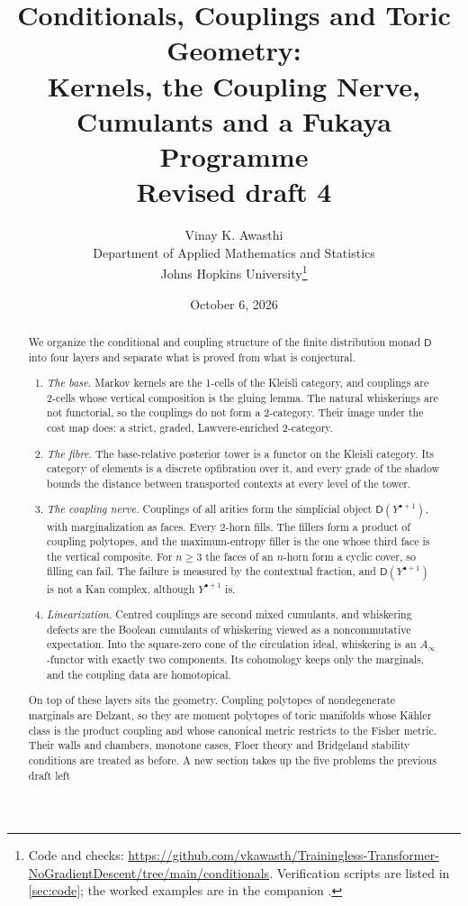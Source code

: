 \documentclass[11pt]{article}
\title{Conditionals, Couplings and Toric Geometry:\\
Kernels, the Coupling Nerve, Cumulants and a Fukaya Programme\\[4pt]
\large Revised draft 4}
\author{Vinay K. Awasthi\\
Department of Applied Mathematics and Statistics\\
Johns Hopkins University\thanks{Code and checks: \url{https://github.com/vkawasth/Trainingless-Transformer-NoGradientDescent/tree/main/conditionals}. Verification scripts are listed in \cref{sec:code}; the worked examples are
in the companion \cite{Awasthi-Family}.}}
\date{October 6, 2026}
\theoremstyle{definition}
\theoremstyle{remark}
\newcommand{\D}{\mathsf{D}}
\begin{document}
\maketitle

\begin{abstract}
We organize the conditional and coupling structure of the finite distribution monad $\D$ into four layers
and separate what is proved from what is conjectural.
\begin{enumerate}[label=(\arabic*),leftmargin=*]
\item \emph{The base.} Markov kernels are the 1-cells of the Kleisli category, and couplings are 2-cells whose
  vertical composition is the gluing lemma. The natural whiskerings are not functorial, so the couplings do not
  form a 2-category. Their image under the cost map does: a strict, graded, Lawvere-enriched 2-category.
\item \emph{The fibre.} The base-relative posterior tower is a functor on the Kleisli category. Its category of
  elements is a discrete opfibration over it, and every grade of the shadow bounds the distance between
  transported contexts at every level of the tower.
\item \emph{The coupling nerve.} Couplings of all arities form the simplicial object $\D(Y^{\bullet+1})$, with
  marginalization as faces. Every 2-horn fills. The fillers form a product of coupling polytopes, and the
  maximum-entropy filler is the one whose third face is the vertical composite. For $n\ge3$ the faces of an
  $n$-horn form a cyclic cover, so filling can fail. The failure is measured by the contextual fraction, and
  $\D(Y^{\bullet+1})$ is not a Kan complex, although $Y^{\bullet+1}$ is.
\item \emph{Linearization.} Centred couplings are second mixed cumulants, and whiskering defects are the
  Boolean cumulants of whiskering viewed as a noncommutative expectation. Into the square-zero cone of the
  circulation ideal, whiskering is an $A_\infty$-functor with exactly two components. Its cohomology keeps
  only the marginals, and the coupling data are homotopical.
\end{enumerate}
On top of these layers sits the geometry. Coupling polytopes of nondegenerate marginals are Delzant, so they
are moment polytopes of toric manifolds whose Kähler class is the product coupling and whose canonical metric
restricts to the Fisher metric. Their walls and chambers, monotone cases, Floer theory and Bridgeland
stability conditions are treated as before. A new section takes up the five problems the previous draft left

\end{abstract}
\end{document}
